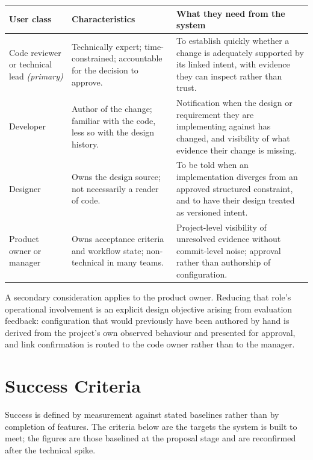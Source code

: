\begin{longtable}{>{\raggedright\arraybackslash}p{}>{\raggedright\arraybackslash}p{}>{\raggedright\arraybackslash}p{}}
\toprule
User class & Characteristics & What they need from the system \\
\midrule
\endhead
Code reviewer or technical lead \emph{(primary)}
  & Technically expert; time-constrained; accountable for the decision to
    approve.
  & To establish quickly whether a change is adequately supported by its linked
    intent, with evidence they can inspect rather than trust. \\
Developer
  & Author of the change; familiar with the code, less so with the design
    history.
  & Notification when the design or requirement they are implementing against
    has changed, and visibility of what evidence their change is missing. \\
Designer
  & Owns the design source; not necessarily a reader of code.
  & To be told when an implementation diverges from an approved structured
    constraint, and to have their design treated as versioned intent. \\
Product owner or manager
  & Owns acceptance criteria and workflow state; non-technical in many teams.
  & Project-level visibility of unresolved evidence without commit-level noise;
    approval rather than authorship of configuration. \\
\bottomrule
\end{longtable}

A secondary consideration applies to the product owner. Reducing that role's
operational involvement is an explicit design objective arising from evaluation
feedback: configuration that would previously have been authored by hand is
derived from the project's own observed behaviour and presented for approval,
and link confirmation is routed to the code owner rather than to the manager.

\section{Success Criteria}

Success is defined by measurement against stated baselines rather than by
completion of features. The criteria below are the targets the system is built
to meet; the figures are those baselined at the proposal stage and are
reconfirmed after the technical spike.

